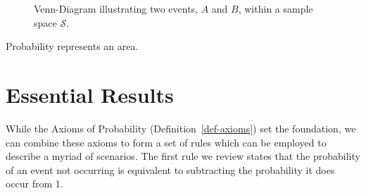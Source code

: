 \documentclass[
  letterpaper,
  DIV=11,
  numbers=noendperiod]{scrreprt}
\theoremstyle{definition}
\theoremstyle{plain}
\theoremstyle{definition}
\theoremstyle{remark}
\begin{document}
\begin{figure}


\caption{\label{fig-fundamentals-venn-diagram}Venn-Diagram illustrating
two events, \(A\) and \(B\), within a sample space \(\mathcal{S}\).}

\end{figure}%

\begin{tcolorbox}[enhanced jigsaw, rightrule=.15mm, leftrule=.75mm, opacityback=0, coltitle=black, bottomrule=.15mm, opacitybacktitle=0.6, left=2mm, colframe=quarto-callout-tip-color-frame, breakable, colback=white, arc=.35mm, toprule=.15mm, toptitle=1mm, bottomtitle=1mm, title=\textcolor{quarto-callout-tip-color}{\faLightbulb}\hspace{0.5em}{Big Idea}, titlerule=0mm, colbacktitle=quarto-callout-tip-color!10!white]

Probability represents an area.

\end{tcolorbox}

\section{Essential Results}\label{essential-results}

While the Axioms of Probability (Definition~\ref{def-axioms}) set the
foundation, we can combine these axioms to form a set of rules which can
be employed to describe a myriad of scenarios. The first rule we review
states that the probability of an event not occurring is equivalent to
subtracting the probability it does occur from 1.
\end{document}
